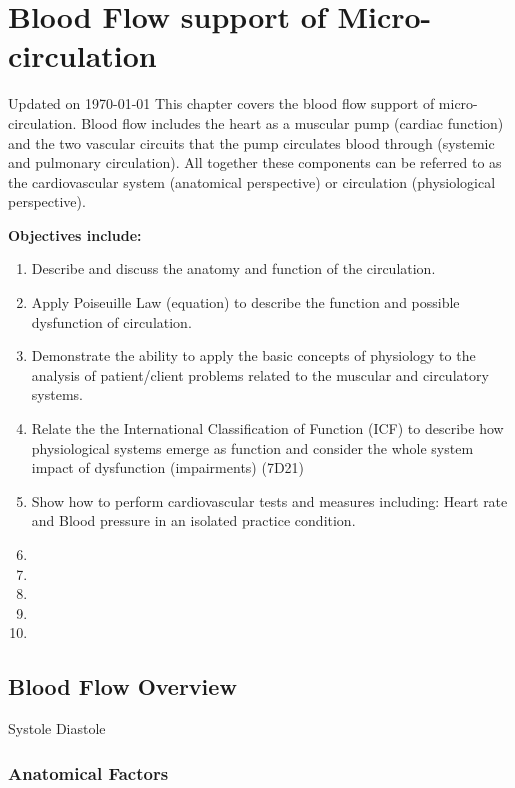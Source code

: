 \chapter{Blood Flow support of Micro-circulation}\label{chp:blood_flow}
Updated on \today
\minitoc
This chapter covers the blood flow support of micro-circulation. Blood flow includes the heart as a muscular pump (cardiac function) and the two vascular circuits that the pump circulates blood through (systemic and pulmonary circulation). All together these components can be referred to as the cardiovascular system (anatomical perspective) or circulation (physiological perspective). 

\vspace{5mm}

\textbf{Objectives include:}
\begin{enumerate}
    \item Describe and discuss the anatomy and function of the circulation.
    \item Apply Poiseuille Law (equation) to describe the function and possible dysfunction of circulation.
    \item Demonstrate the ability to apply the basic concepts of physiology to the analysis of patient/client problems related to the muscular and  circulatory systems.
    \item Relate the the International Classification of Function (ICF) to describe how physiological systems emerge as function and consider the whole system impact of dysfunction (impairments) (7D21)
    \item Show how to perform cardiovascular tests and measures including: Heart rate and Blood pressure in an isolated practice condition.
    \item
    \item
    \item
    \item
    \item
\end{enumerate}


\section{Blood Flow Overview}

Systole
Diastole

\subsection{Anatomical Factors}

